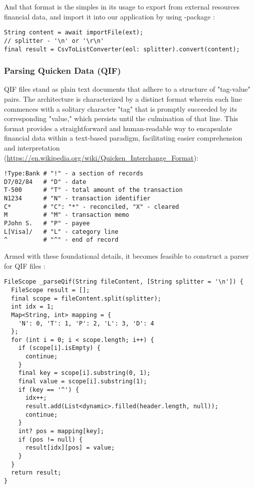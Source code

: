 And that format is the simples in its usage to export from external resources financial data, and import it into our 
application by using -package :

\begin{lstlisting}
String content = await importFile(ext);
// splitter - '\n' or '\r\n'
final result = CsvToListConverter(eol: splitter).convert(content);
\end{lstlisting}


\subsubsection{Parsing Quicken Data (QIF)}

QIF files stand as plain text documents that adhere to a structure of "tag-value" pairs. The architecture is 
characterized by a distinct format wherein each line commences with a solitary character "tag" that is promptly 
succeeded by its corresponding "value," which persists until the culmination of that line. This format provides a 
straightforward and human-readable way to encapsulate financial data within a text-based paradigm, facilitating 
easier comprehension and interpretation
(\href{https://en.wikipedia.org/wiki/Quicken_Interchange_Format}{https://en.wikipedia.org/wiki/Quicken\_Interchange\_Format}):

\begin{lstlisting}[language=terminal]
!Type:Bank # "!" - a section of records
D7/02/84   # "D" - date
T-500      # "T" - total amount of the transaction
N1234      # "N" - transaction identifier
C*         # "C": "*" - reconciled, "X" - cleared
M          # "M" - transaction memo
PJohn S.   # "P" - payee
L[Visa]/   # "L" - category line
^          # "^" - end of record
\end{lstlisting}

\noindent Armed with these foundational details, it becomes feasible to construct a parser for QIF files 
:

\begin{lstlisting}
FileScope _parseQif(String fileContent, [String splitter = '\n']) {
  FileScope result = [];
  final scope = fileContent.split(splitter);
  int idx = 1;
  Map<String, int> mapping = {
    'N': 0, 'T': 1, 'P': 2, 'L': 3, 'D': 4
  };
  for (int i = 0; i < scope.length; i++) {
    if (scope[i].isEmpty) {
      continue;
    }
    final key = scope[i].substring(0, 1);
    final value = scope[i].substring(1);
    if (key == '^') {
      idx++;
      result.add(List<dynamic>.filled(header.length, null));
      continue;
    }
    int? pos = mapping[key];
    if (pos != null) {
      result[idx][pos] = value;
    }
  }
  return result;
}
\end{lstlisting}


